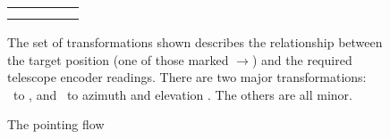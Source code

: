 \begin{figure}
\begin{small}
\begin{center}
\begin{tabular}{|ccccc|}
&                 &                                &                & \\
&                 &                                &                & \\
                                                                      \hline
\end{tabular}
\end{center}
\end{small}
\caption{The pointing flow}
The set of transformations shown describes the relationship between the target
position (one of those marked $\rightarrow$) and the required telescope encoder
readings.  There are two major transformations: \radec\ to \mhadec, and \mhadec\
to azimuth and elevation \azel.  The others are all minor.
\end{figure}
\clearpage

\newpage

